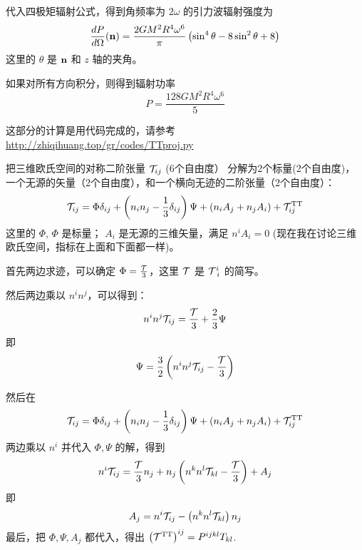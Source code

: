 \documentclass[CJK,13pt]{beamer}
\begin{document}
    \begin{frame}
      代入四极矩辐射公式，得到角频率为 $2\omega$ 的引力波辐射强度为
      $$\frac{dP}{d\Omega} ({\mathbf{n}}) = \frac{2GM^2R^4 \omega^6}{\pi}\left(\sin^4\theta - 8\sin^2\theta + 8\right)$$
      这里的 $\theta$ 是 ${\mathbf{n}}$ 和 $z$ 轴的夹角。

      \skipline
      
      如果对所有方向积分，则得到辐射功率
      $$ P =  \frac{128 GM^2R^4 \omega^6}{5}$$

      这部分的计算是用代码完成的，请参考
      \url{http://zhiqihuang.top/gr/codes/TTproj.py}
    \end{frame}


    \begin{frame}

      把三维欧氏空间的对称二阶张量 $\mathcal{T}_{ij}$ (6个自由度） 分解为2个标量(2个自由度)，一个无源的矢量（2个自由度），和一个横向无迹的二阶张量（2个自由度）：
      $$\mathcal{T}_{ij} = \Phi\delta_{ij} + \left(n_in_j - \frac{1}{3}\delta_{ij}\right)\Psi + (n_iA_j + n_j A_i) + \mathcal{T}^{\rm TT}_{ij} $$
        这里的 $\Phi$, $\Phi$ 是标量； $A_i$ 是无源的三维矢量，满足 $n^iA_i=0$ (现在我在讨论三维欧氏空间，指标在上面和下面都一样)。

        首先两边求迹，可以确定 $\Phi = \frac{\mathcal{T}}{3}$，这里 $\mathcal{T}$ 是 $\mathcal{T}^i_{\ i}$ 的简写。

        然后两边乘以 $n^in^j$，可以得到：
        $$n^in^j\mathcal{T}_{ij} = \frac{\mathcal{T}}{3} + \frac{2}{3}\Psi $$
        即
        $$\Psi = \frac{3}{2}\left(n^in^j\mathcal{T}_{ij} - \frac{\mathcal{T}}{3}\right)$$
  \end{frame}


    \begin{frame}
      然后在
      $$\mathcal{T}_{ij} = \Phi\delta_{ij} + \left(n_in_j - \frac{1}{3}\delta_{ij}\right)\Psi + (n_iA_j + n_j A_i) + \mathcal{T}^{\rm TT}_{ij} $$
      两边乘以 $n^i$ 并代入 $\Phi, \Psi$ 的解，得到
      $$ n^i\mathcal{T}_{ij} = \frac{\mathcal{T}}{3}n_j +  n_j\left(n^kn^l\mathcal{T}_{kl} - \frac{\mathcal{T}}{3}\right) + A_j $$
      即
      $$ A_j =  n^i\mathcal{T}_{ij} -  \left(n^kn^l\mathcal{T}_{kl}\right)n_j $$
      最后，把 $\Phi, \Psi, A_j$ 都代入，得出 $ \left(\mathcal{T}^{\rm TT}\right)^{ij} = P^{ijkl}T_{kl}$.
    \end{frame}


    
    
    
  
    \ech
\end{document}

